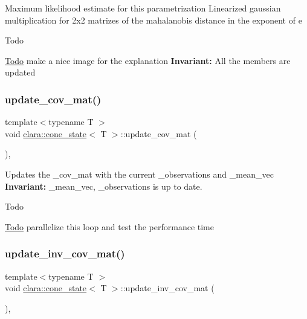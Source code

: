 Maximum likelihood estimate for this parametrization Linearized gaussian multiplication for 2x2 matrizes of the mahalanobis distance in the exponent of {\ttfamily e} 

\begin{DoxyRefDesc}{Todo}
\item[\hyperlink{todo__todo000003}{Todo}]make a nice image for the explanation {\bfseries Invariant\+:} All the members are updated \end{DoxyRefDesc}
\mbox{\label{classclara_1_1cone__state_a946bca664d068d7a82e3740eb736e948}} 
\subsubsection{\texorpdfstring{update\+\_\+cov\+\_\+mat()}{update\_cov\_mat()}}
{\footnotesize\ttfamily template$<$typename T $>$ \\
void \hyperlink{classclara_1_1cone__state}{clara\+::cone\+\_\+state}$<$ T $>$\+::update\+\_\+cov\+\_\+mat (\begin{DoxyParamCaption}{ }\end{DoxyParamCaption})\hspace{0.3cm}{\ttfamily [inline]}, {\ttfamily [private]}}



Updates the {\ttfamily \+\_\+cov\+\_\+mat} with the current {\ttfamily \+\_\+observations} and {\ttfamily \+\_\+mean\+\_\+vec} {\bfseries Invariant\+:} {\ttfamily \+\_\+mean\+\_\+vec}, {\ttfamily \+\_\+observations} is up to date. 

\begin{DoxyRefDesc}{Todo}
\item[\hyperlink{todo__todo000005}{Todo}]parallelize this loop and test the performance time \end{DoxyRefDesc}
\mbox{\label{classclara_1_1cone__state_a7b0d6ab972d3d003eaad439c630c1c73}} 
\subsubsection{\texorpdfstring{update\+\_\+inv\+\_\+cov\+\_\+mat()}{update\_inv\_cov\_mat()}}
{\footnotesize\ttfamily template$<$typename T $>$ \\
void \hyperlink{classclara_1_1cone__state}{clara\+::cone\+\_\+state}$<$ T $>$\+::update\+\_\+inv\+\_\+cov\+\_\+mat (\begin{DoxyParamCaption}{ }\end{DoxyParamCaption})\hspace{0.3cm}{\ttfamily [inline]}, {\ttfamily [private]}}



